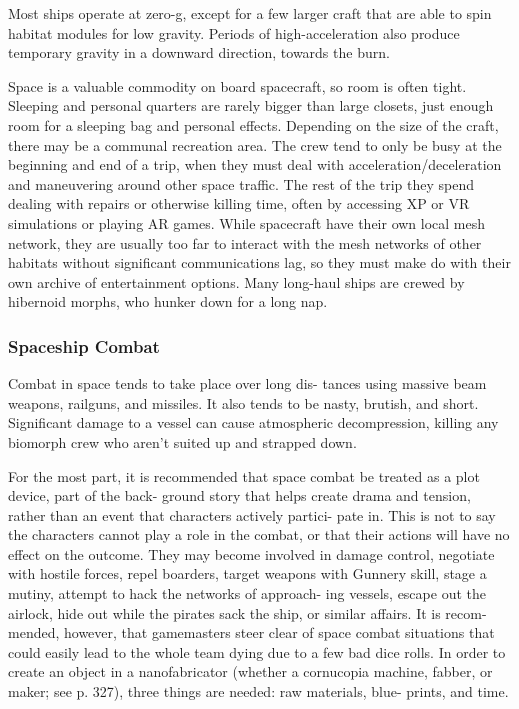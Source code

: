 Most ships operate at zero-g, except for a few larger 
craft that are able to spin habitat modules for low 
gravity. Periods of high-acceleration also produce 
temporary gravity in a downward direction, towards 
the burn.

Space is a valuable commodity on board spacecraft, 
so room is often tight. Sleeping and personal quarters 
are rarely bigger than large closets, just enough room 
for a sleeping bag and personal effects. Depending 
on the size of the craft, there may be a communal 
recreation area. The crew tend to only be busy at the 
beginning and end of a trip, when they must deal with 
acceleration/deceleration and maneuvering around 
other space traffic. The rest of the trip they spend 
dealing with repairs or otherwise killing time, often 
by accessing XP or VR simulations or playing AR 
games. While spacecraft have their own local mesh 
network, they are usually too far to interact with the 
mesh networks of other habitats without significant 
communications lag, so they must make do with 
their own archive of entertainment options. Many 
long-haul ships are crewed by hibernoid morphs, who 
hunker down for a long nap.

\subsubsection{Spaceship Combat}

Combat in space tends to take place over long dis-
tances using massive beam weapons, railguns, and 
missiles. It also tends to be nasty, brutish, and short. 
Significant damage to a vessel can cause atmospheric 
decompression, killing any biomorph crew who aren't 
suited up and strapped down. 

For the most part, it is recommended that space 
combat be treated as a plot device, part of the back-
ground story that helps create drama and tension, 
rather than an event that characters actively partici-
pate in. This is not to say the characters cannot play a 
role in the combat, or that their actions will have no 
effect on the outcome. They may become involved in 
damage control, negotiate with hostile forces, repel 
boarders, target weapons with Gunnery skill, stage a 
mutiny, attempt to hack the networks of approach-
ing vessels, escape out the airlock, hide out while the 
pirates sack the ship, or similar affairs. It is recom-
mended, however, that gamemasters steer clear of 
space combat situations that could easily lead to the 
whole team dying due to a few bad dice rolls.
In order to create an object in a nanofabricator 
(whether a cornucopia machine, fabber, or maker; see 
p. 327), three things are needed: raw materials, blue-
prints, and time.

